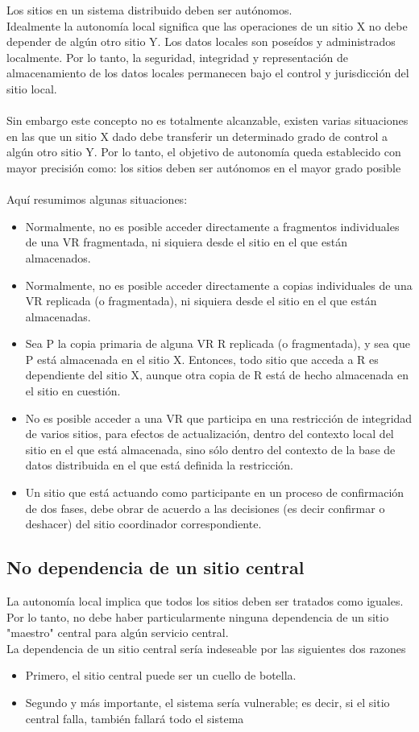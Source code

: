 \documentclass[10pt,a4paper,oneside]{article}
\begin{document}
\begin {itemize}
Los sitios en un sistema distribuido deben ser aut\'onomos.
\\Idealmente la autonom\'ia local significa que las operaciones de un sitio X no debe depender de alg\'un otro sitio Y. Los datos locales son pose\'idos y administrados localmente. Por lo tanto, la seguridad, integridad y representaci\'on de almacenamiento de los datos locales permanecen bajo el control y jurisdicci\'on del sitio local.
\\\\Sin embargo este concepto no es totalmente alcanzable, existen varias situaciones en las que un sitio X dado debe transferir un determinado grado de control a alg\'un otro sitio Y. Por lo tanto, el objetivo de autonom\'ia queda establecido con mayor precisi\'on como: los sitios deben ser aut\'onomos en el mayor grado posible
\\\\Aqu\'i resumimos algunas situaciones: 
\begin{itemize}
\item Normalmente, no es posible acceder directamente a fragmentos individuales de una VR fragmentada, ni siquiera desde el sitio en el que est\'an almacenados.
\item Normalmente, no es posible acceder directamente a copias individuales de una VR  replicada (o fragmentada), ni siquiera desde el sitio en el que est\'an almacenadas.
\item Sea P la copia primaria de alguna VR R replicada (o fragmentada), y sea que P est\'a almacenada en el sitio X. Entonces, todo sitio que acceda a R es dependiente del sitio X, aunque otra copia de R est\'a de hecho almacenada en el sitio en cuesti\'on.
\item No es posible acceder a una VR que participa en una restricci\'on de integridad de varios sitios, para efectos de actualizaci\'on, dentro del contexto local del sitio en el que est\'a almacenada, sino s\'olo dentro del contexto de la base de datos distribuida en el que est\'a definida la restricci\'on.
\item Un sitio que est\'a actuando como participante en un proceso de confirmaci\'on de dos fases, debe obrar de acuerdo a las decisiones (es decir confirmar o deshacer) del sitio coordinador correspondiente.
\end{itemize}
\subsection{No dependencia de un sitio central}
La autonom\'ia local implica que todos los sitios deben ser tratados como iguales. Por lo tanto, no debe haber particularmente ninguna dependencia de un sitio "maestro" central para alg\'un servicio central. 
\\La dependencia de un sitio central ser\'ia indeseable por las siguientes dos razones
\begin{itemize}
\item Primero, el sitio central puede ser un cuello de botella. 
\item Segundo y m\'as importante, el sistema ser\'ia vulnerable; es decir, si el sitio central falla, tambi\'en fallar\'a todo el sistema
\end{itemize}

\end{itemize}
\end{document}
